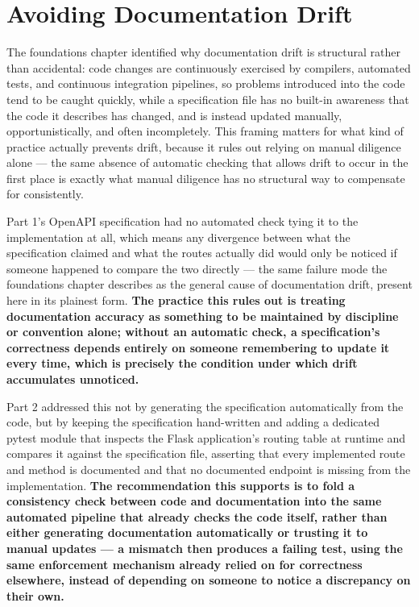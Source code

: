 \section{Avoiding Documentation Drift}

The foundations chapter identified why documentation drift is structural rather than accidental: code changes are continuously exercised by compilers, automated tests, and continuous integration pipelines, so problems introduced into the code tend to be caught quickly, while a specification file has no built-in awareness that the code it describes has changed, and is instead updated manually, opportunistically, and often incompletely. This framing matters for what kind of practice actually prevents drift, because it rules out relying on manual diligence alone --- the same absence of automatic checking that allows drift to occur in the first place is exactly what manual diligence has no structural way to compensate for consistently.

Part 1's OpenAPI specification had no automated check tying it to the implementation at all, which means any divergence between what the specification claimed and what the routes actually did would only be noticed if someone happened to compare the two directly --- the same failure mode the foundations chapter describes as the general cause of documentation drift, present here in its plainest form. \textbf{The practice this rules out is treating documentation accuracy as something to be maintained by discipline or convention alone; without an automatic check, a specification's correctness depends entirely on someone remembering to update it every time, which is precisely the condition under which drift accumulates unnoticed.}

Part 2 addressed this not by generating the specification automatically from the code, but by keeping the specification hand-written and adding a dedicated pytest module that inspects the Flask application's routing table at runtime and compares it against the specification file, asserting that every implemented route and method is documented and that no documented endpoint is missing from the implementation. \textbf{The recommendation this supports is to fold a consistency check between code and documentation into the same automated pipeline that already checks the code itself, rather than either generating documentation automatically or trusting it to manual updates --- a mismatch then produces a failing test, using the same enforcement mechanism already relied on for correctness elsewhere, instead of depending on someone to notice a discrepancy on their own.}

